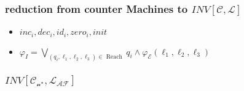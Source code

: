\begin{frame}
    \frametitle{reduction from counter Machines to $INV[\mathcal{C},\mathcal{L}]$}
    \begin{itemize}
        \item $inc_i, dec_i, id_i, zero_i, init$
        \item $\varphi_{I}=\bigvee_{\left(q_{i}, \ell_{1}, \ell_{2}, \ell_{3}\right) \in \text { Reach }} q_{i} \wedge \varphi_{\mathcal{E}}\left(\ell_{1}, \ell_{2}, \ell_{3}\right) $
    \end{itemize}
\end{frame}
\begin{frame}
    \frametitle{$INV[\mathcal{C_{n^{\star}}},\mathcal{L_{AF}}]$}
    \begin{itemize}
        
    \end{itemize}
\end{frame}
